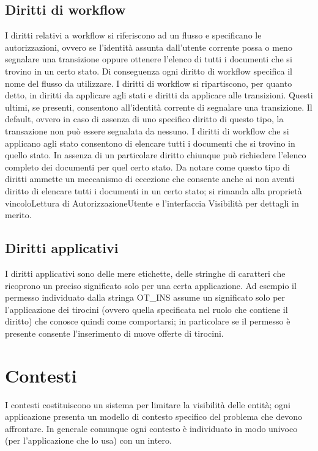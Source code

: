 \subsection{Diritti di workflow}
 I diritti relativi a workflow  si riferiscono ad un flusso e specificano le autorizzazioni, ovvero  se l'identità assunta dall'utente corrente possa o meno segnalare una transizione oppure ottenere l'elenco di tutti i documenti che si trovino in un certo stato. Di conseguenza ogni diritto di workflow specifica il nome del flusso da utilizzare.
I diritti di workflow si ripartiscono, per quanto detto, in diritti da applicare agli stati e diritti da applicare alle transizioni. Questi ultimi, se presenti, consentono all'identità corrente di segnalare una transizione. Il default, ovvero in caso di assenza di uno specifico diritto di questo tipo, la transazione non può essere segnalata da nessuno.
I diritti di workflow che si applicano agli stato consentono di elencare tutti i documenti che si trovino in quello stato. In assenza di un particolare diritto chiunque può richiedere l'elenco completo dei documenti per quel certo stato. Da notare come questo tipo di diritti ammette un meccanismo di eccezione che consente anche ai non aventi diritto di elencare tutti i documenti in un certo stato; si rimanda alla proprietà vincoloLettura di AutorizzazioneUtente e l'interfaccia Visibilità per dettagli in merito.

\subsection{Diritti applicativi}

I diritti applicativi sono delle mere etichette, delle stringhe di caratteri che ricoprono un preciso significato solo per una certa applicazione. Ad esempio il permesso individuato dalla stringa OT\_INS assume un significato solo per l'applicazione dei tirocini (ovvero quella specificata nel ruolo che contiene il diritto)  che conosce quindi come comportarsi; in particolare se il permesso è presente consente l'inserimento di nuove offerte di tirocini.

\section{Contesti}
I contesti costituiscono un sistema per limitare la visibilità delle entità; ogni applicazione presenta un modello di contesto specifico del problema che devono affrontare. In generale comunque ogni contesto è individuato in modo univoco (per l'applicazione che lo usa) con un intero.

